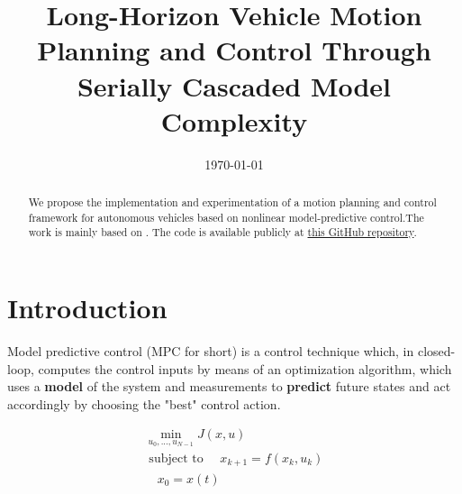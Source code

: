 \documentclass[a4paper, twocolumn, 11pt, twoside]{article}
\title{Long-Horizon Vehicle Motion Planning and Control Through Serially Cascaded Model Complexity}
\author{}
\date{\today}
\begin{document}
\maketitle

\begin{abstract}
    We propose the implementation and experimentation of a motion planning and
    control framework for autonomous vehicles based on nonlinear
    model-predictive control.The work is mainly based on \cite{paper}. The code is available publicly at
    \href{https://github.com/neverorfrog/vehicle-control}{this GitHub
    repository}. 
\end{abstract}


\section*{Introduction}

Model predictive control (MPC for short) is a control technique which, in closed-loop,
computes the control inputs by means of an optimization algorithm, which uses a
\textbf{model} of the system and measurements to \textbf{predict} future states and act
accordingly by choosing the "best" control action. 

\begin{equation}
\begin{aligned}
    \min_{u_0,...,u_{N-1}}{J(x,u)} \\
    \text{ subject to }
        \quad x_{k+1} = f(x_k,u_k) \\
        \quad x_0 = x(t)
        \quad 
\end{aligned}
\end{equation}
\end{document}
